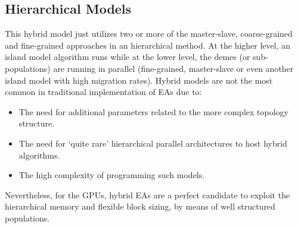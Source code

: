 \documentclass{comjnl}
\begin{document}
\subsection{Hierarchical Models}

This hybrid model just utilizes two or more of the master-slave, coarse-grained and fine-grained approaches in an hierarchical method. At the higher level, an island model algorithm runs while at the lower level, the demes (or sub-populations) are running in parallel (fine-grained, master-slave or even another island model with high migration rates). Hybrid models are not the most common in traditional implementation of EAs due to:
\begin{itemize}
 \item The need for additional parameters related to the more complex topology structure. 
 \item The need for `quite rare' hierarchical parallel architectures to host hybrid algorithms. 
\item The high complexity of programming such models. 
\end{itemize}

Nevertheless, for the GPUs, hybrid EAs are a perfect candidate to exploit the hierarchical memory and flexible block sizing, by means of well structured populations. 
\end{document}
